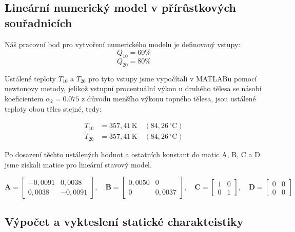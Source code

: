 \documentclass[12pt]{article} %
\begin{document}
\subsection{Lineární numerický model v přírůstkových souřadnicích}
Náš pracovní bod pro vytvoření numerického modelu je definovaný vstupy:
$$Q_{10} = 60\%$$
$$Q_{20} = 80\%$$

Ustálené teploty $T_{10}$ a $T_{20}$ pro tyto vstupy jsme vypočítali v MATLABu pomocí newtonovy metody, jelikož vstupní procentuální výkon u druhého tělesa se násobí koeficientem $\alpha_2= 0.075$ z důvodu menšího výkonu topného tělesa, jsou ustálené teploty obou těles stejné, tedy:

\begin{align}
    T_{10} &= 357{,}41\,\mathrm{K} \quad (84{,}26\,^\circ\mathrm{C}) \\
    T_{20} &= 357{,}41\,\mathrm{K} \quad (84{,}26\,^\circ\mathrm{C})
\end{align}

Po dosazení těchto ustálených hodnot a ostatních konstant do matic A, B, C a D jsme získali matice pro lineární stavový model.

\begin{equation}
    \mathbf{A} = \begin{bmatrix} -0{,}0091 & 0{,}0038 \\ 0{,}0038 & -0{,}0091 \end{bmatrix}, \quad
    \mathbf{B} = \begin{bmatrix} 0{,}0050 & 0 \\ 0 & 0{,}0037 \end{bmatrix}, \quad
    \mathbf{C} = \begin{bmatrix} 1 & 0 \\ 0 & 1 \end{bmatrix}, \quad
    \mathbf{D} = \begin{bmatrix} 0 & 0 \\ 0 & 0 \end{bmatrix}
\end{equation}

\subsection{Výpočet a vykteslení statické charakteistiky}
\end{document}
